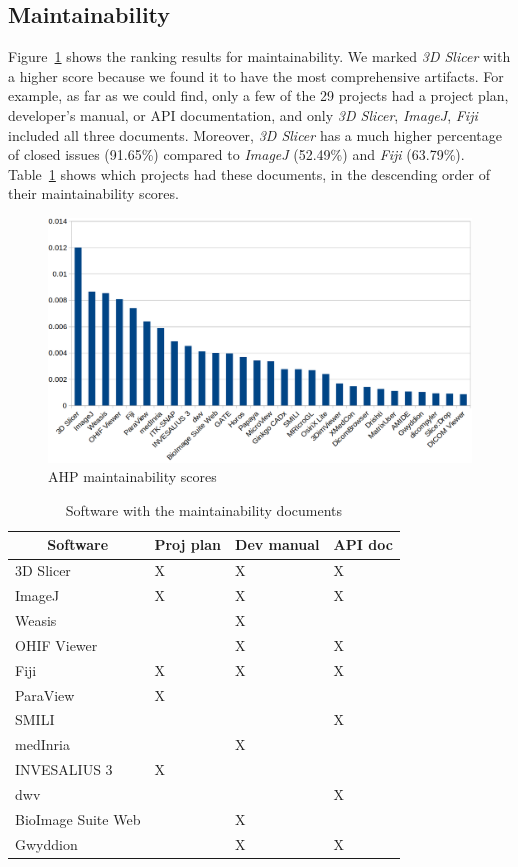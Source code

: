 \documentclass[final, 3p, times, authoryear]{elsarticle}
\begin{document}
\subsection{Maintainability} \label{sec_score_maintainability}

Figure~\ref{fg_maintainability_scores} shows the ranking results for
maintainability. We marked \textit{3D Slicer} with a higher score because
we found it to have the most comprehensive artifacts. For example, as far as we
could find, only a few of the 29 projects had a project plan, developer's
manual, or API documentation, and only \textit{3D Slicer}, \textit{ImageJ},
\textit{Fiji} included all three documents. Moreover, \textit{3D Slicer} has a
much higher percentage of closed issues (91.65\%) compared to \textit{ImageJ}
(52.49\%) and \textit{Fiji} (63.79\%). Table~\ref{tab_maintainability_docs}
shows which projects had these documents, in the descending order of their
maintainability scores. 

\begin{figure}[!ht]
\includegraphics[scale=0.38]{figures/maintainability_scores.png}
\caption{AHP maintainability scores}
\label{fg_maintainability_scores}
\end{figure}

\begin{table}[!ht]
\centering
\begin{tabular}{llll}
\hline
\multicolumn{1}{c}{Software} & Proj plan & Dev manual & API doc \\ \hline
3D Slicer & X & X & X \\
ImageJ & X & X & X \\
Weasis &  & X &  \\
OHIF Viewer &  & X & X \\
Fiji & X & X & X \\
ParaView & X &  &  \\
SMILI &  &  & X \\
medInria &  & X &  \\
INVESALIUS 3 & X &  &  \\
dwv &  &  & X \\
BioImage Suite Web &  & X &  \\
Gwyddion &  & X & X \\ \hline
\end{tabular}
\caption{\label{tab_maintainability_docs}Software with the maintainability documents}
\end{table}
\end{document}
